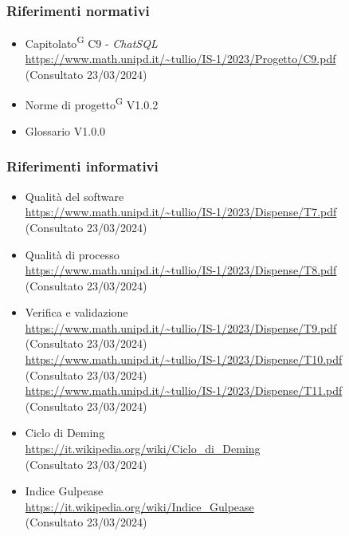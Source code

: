 \documentclass[5pt]{article}
\begin{document}
	\subsubsection{Riferimenti normativi}
	\begin{itemize}
		\item Capitolato\textsuperscript{G} C9 - \textit{ChatSQL} \\ \url{https://www.math.unipd.it/~tullio/IS-1/2023/Progetto/C9.pdf} \\ (Consultato 23/03/2024)
		\item Norme di progetto\textsuperscript{G} V1.0.2
		\item Glossario V1.0.0
	\end{itemize}
	\subsubsection{Riferimenti informativi}
	\begin{itemize}
		\item Qualità del software \\ \url{https://www.math.unipd.it/~tullio/IS-1/2023/Dispense/T7.pdf} \\ (Consultato 23/03/2024)
		\item Qualità di processo \\ \url{https://www.math.unipd.it/~tullio/IS-1/2023/Dispense/T8.pdf} \\ (Consultato 23/03/2024)
		\item Verifica e validazione \\
		\url{https://www.math.unipd.it/~tullio/IS-1/2023/Dispense/T9.pdf} \\ (Consultato 23/03/2024) \\
		\url{https://www.math.unipd.it/~tullio/IS-1/2023/Dispense/T10.pdf} \\ (Consultato 23/03/2024) \\
		\url{https://www.math.unipd.it/~tullio/IS-1/2023/Dispense/T11.pdf} \\ (Consultato 23/03/2024)
		\item Ciclo di Deming \\
		\url{https://it.wikipedia.org/wiki/Ciclo_di_Deming} \\ (Consultato 23/03/2024)
		\item Indice Gulpease \\
		\url{https://it.wikipedia.org/wiki/Indice_Gulpease} \\ (Consultato 23/03/2024)
	\end{itemize}
	
\end{document}

